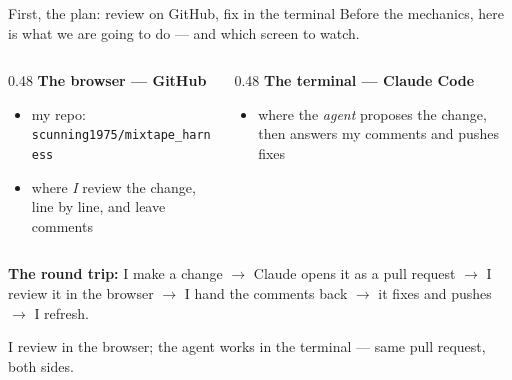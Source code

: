 \documentclass[aspectratio=169,11pt]{beamer}
\begin{document}
\begin{frame}{First, the plan: review on GitHub, fix in the terminal}
Before the mechanics, here is what we are going to do --- and which screen to watch.
\vspace{0.3cm}
\begin{columns}[T]
\begin{column}{0.48\textwidth}
\textbf{The browser --- GitHub}
\begin{itemize}\setlength\itemsep{0.22em}
    \item my repo: \texttt{scunning1975/mixtape\_harness}
    \item where \emph{I} review the change, line by line, and leave comments
\end{itemize}
\end{column}
\begin{column}{0.48\textwidth}
\textbf{The terminal --- Claude Code}
\begin{itemize}\setlength\itemsep{0.22em}
    \item where the \emph{agent} proposes the change, then answers my comments and pushes fixes
\end{itemize}
\end{column}
\end{columns}
\vspace{0.3cm}

\textbf{The round trip:} I make a change $\rightarrow$ Claude opens it as a pull request $\rightarrow$ I review it in the browser $\rightarrow$ I hand the comments back $\rightarrow$ it fixes and pushes $\rightarrow$ I refresh.
\vspace{0.1cm}

\alert{I review in the browser; the agent works in the terminal --- same pull request, both sides.}
\end{frame}
\end{document}
